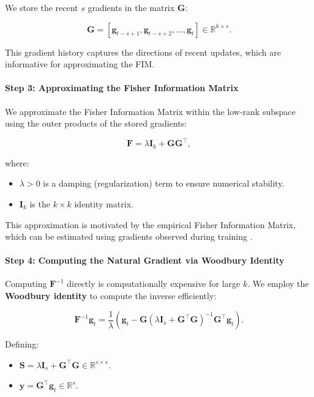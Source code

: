 We store the recent $s$ gradients in the matrix $\mathbf{G}$:

\[
\mathbf{G} = [\mathbf{g}_{t - s + 1}, \mathbf{g}_{t - s + 2}, \dots, \mathbf{g}_t] \in \mathbb{R}^{k \times s}.
\]

This gradient history captures the directions of recent updates, which are informative for approximating the FIM.

\paragraph{Step 3: Approximating the Fisher Information Matrix}

We approximate the Fisher Information Matrix within the low-rank subspace using the outer products of the stored gradients:

\[
\mathbf{F} = \lambda \mathbf{I}_k + \mathbf{G} \mathbf{G}^\top,
\]

where:

\begin{itemize}
    \item $\lambda > 0$ is a damping (regularization) term to ensure numerical stability.
    \item $\mathbf{I}_k$ is the $k \times k$ identity matrix.
\end{itemize}

This approximation is motivated by the empirical Fisher Information Matrix, which can be estimated using gradients observed during training \citep{martensNewPerspectiveNatural2014}.

\paragraph{Step 4: Computing the Natural Gradient via Woodbury Identity}

Computing $\mathbf{F}^{-1}$ directly is computationally expensive for large $k$. We employ the \textbf{Woodbury identity} to compute the inverse efficiently:

\[
\mathbf{F}^{-1} \mathbf{g}_t = \frac{1}{\lambda} \left( \mathbf{g}_t - \mathbf{G} \left( \lambda \mathbf{I}_s + \mathbf{G}^\top \mathbf{G} \right)^{-1} \mathbf{G}^\top \mathbf{g}_t \right).
\]

Defining:

\begin{itemize}
    \item $\mathbf{S} = \lambda \mathbf{I}_s + \mathbf{G}^\top \mathbf{G} \in \mathbb{R}^{s \times s}$.
    \item $\mathbf{y} = \mathbf{G}^\top \mathbf{g}_t \in \mathbb{R}^s$.
\end{itemize}

